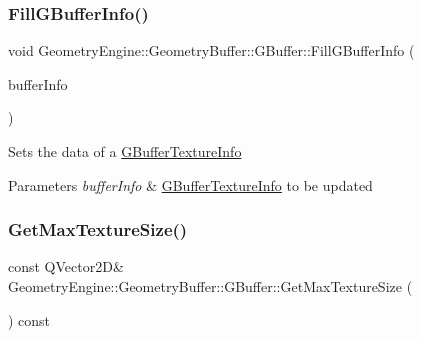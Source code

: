 \mbox{\label{class_geometry_engine_1_1_geometry_buffer_1_1_g_buffer_ad1242e69d277b69b58497f7d489e176c}} 
\subsubsection{\texorpdfstring{FillGBufferInfo()}{FillGBufferInfo()}}
{\footnotesize\ttfamily void Geometry\+Engine\+::\+Geometry\+Buffer\+::\+G\+Buffer\+::\+Fill\+G\+Buffer\+Info (\begin{DoxyParamCaption}\item[{\mbox{\hyperlink{class_geometry_engine_1_1_g_buffer_texture_info}{G\+Buffer\+Texture\+Info}} \&}]{buffer\+Info }\end{DoxyParamCaption})}

Sets the data of a \mbox{\hyperlink{class_geometry_engine_1_1_g_buffer_texture_info}{G\+Buffer\+Texture\+Info}} 
\begin{DoxyParams}{Parameters}
{\em buffer\+Info} & \mbox{\hyperlink{class_geometry_engine_1_1_g_buffer_texture_info}{G\+Buffer\+Texture\+Info}} to be updated \\
\hline
\end{DoxyParams}
\mbox{\label{class_geometry_engine_1_1_geometry_buffer_1_1_g_buffer_a47bda4849000d2728538de4e2f27f11a}} 
\subsubsection{\texorpdfstring{GetMaxTextureSize()}{GetMaxTextureSize()}}
{\footnotesize\ttfamily const Q\+Vector2D\& Geometry\+Engine\+::\+Geometry\+Buffer\+::\+G\+Buffer\+::\+Get\+Max\+Texture\+Size (\begin{DoxyParamCaption}{ }\end{DoxyParamCaption}) const\hspace{0.3cm}{\ttfamily [inline]}}

